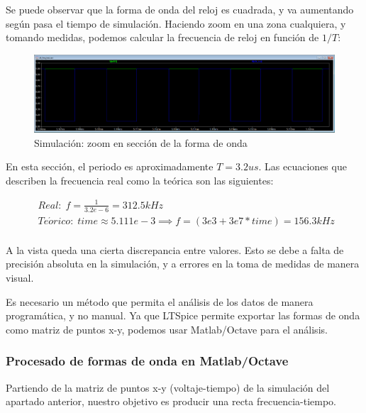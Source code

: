 \documentclass[12pt]{report} %
\begin{document}
	Se puede observar que la forma de onda del reloj es cuadrada, y va aumentando según pasa el tiempo de simulación. Haciendo zoom en una zona cualquiera, y tomando medidas, podemos calcular la frecuencia de reloj en función de $1/T$:

	\begin{figure}[H]
		\includegraphics[width=1\textwidth]{clk-freq-sim-waveform-zoom.PNG}
		\caption[Simulación: zoom en sección de la forma de onda]{Simulación: zoom en sección de la forma de onda}
		\label{fig:clk-freq-sim-waveform-zoom.PNG}
	\end{figure}
	
	En esta sección, el periodo es aproximadamente $T=3.2us$. Las ecuaciones que describen la frecuencia real como la teórica son las siguientes:
	
	\begin{figure}[H]
		\begin{equation} \label{eq:clk-freq_eqs_freq}
		\begin{array}{c}
		Real:\; f = \frac{1}{3.2e-6} = 312.5kHz \\
		Te\acute{o}rico:\; time\approx5.111e-3 \implies f = (3e3 + 3e7 * time) = 156.3kHz \\
		\end{array}
		\end{equation}
	\end{figure}

	A la vista queda una cierta discrepancia entre valores. Esto se debe a falta de precisión absoluta en la simulación, y a errores en la toma de medidas de manera visual.
	
	Es necesario un método que permita el análisis de los datos de manera programática, y no manual. Ya que LTSpice permite exportar las formas de onda como matriz de puntos x-y, podemos usar Matlab/Octave para el análisis.
	
	\subsubsection{Procesado de formas de onda en Matlab/Octave}
	
	Partiendo de la matriz de puntos x-y (voltaje-tiempo) de la simulación del apartado anterior, nuestro objetivo es producir una recta frecuencia-tiempo.
	
\end{document}
